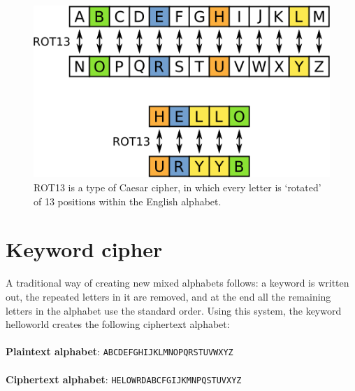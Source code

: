 \documentclass[Lau,binding=0.6cm,oneside]{sapthesis}
\begin{document}
\begin{figure}[h]
\includegraphics[scale=0.4]{rot13}
\captionsetup{justification=centering, margin=2cm}
\centering
\caption{\textsf{ROT13} is a type of Caesar cipher, in which every letter is `rotated' of 13 positions within the English alphabet.}
\centering
\end{figure}

\section{Keyword cipher}

A traditional way of creating new mixed alphabets follows: a keyword is written out, the repeated letters in it are removed, and at the end all the remaining letters in the alphabet use the standard order. Using this system, the keyword \textsf{helloworld} creates the following ciphertext alphabet:\\\\
	\textbf{Plaintext alphabet}: \colorbox{gray!12}{\small{\texttt{ABCDEFGHIJKLMNOPQRSTUVWXYZ}}}\\\\
	\textbf{Ciphertext alphabet}:	\colorbox{gray!12}{\small{\texttt{HELOWRDABCFGIJKMNPQSTUVXYZ}}}\\
\end{document}
